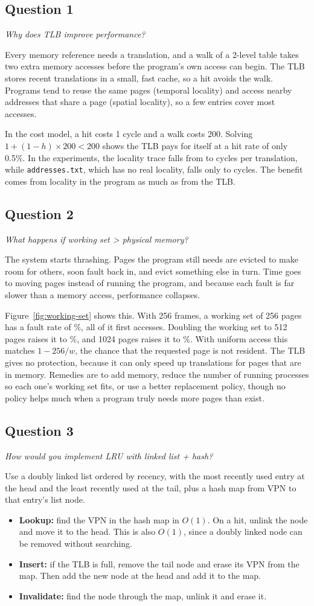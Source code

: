 \documentclass[11pt]{article}
\newcommand{\question}[2]{\subsection*{Question #1}\noindent\textit{#2}\par\medskip}
\newcommand{\code}[1]{\texttt{#1}}
\begin{document}
\question{1}{Why does TLB improve performance?}

Every memory reference needs a translation, and a walk of a 2-level table takes
two extra memory accesses before the program's own access can begin. The TLB
stores recent translations in a small, fast cache, so a hit avoids the walk.
Programs tend to reuse the same pages (temporal locality) and access nearby
addresses that share a page (spatial locality), so a few entries cover most
accesses.

In the cost model, a hit costs 1 cycle and a walk costs 200. Solving
$1 + (1 - h) \times 200 < 200$ shows the TLB pays for itself at a hit rate of only
0.5\%. In the experiments, the locality trace falls from \LocalBaseCycles{} to
\LocalCycles{} cycles per translation, while \code{addresses.txt}, which has no
real locality, falls only to \AvgCycles{} cycles. The benefit comes from locality
in the program as much as from the TLB.

\question{2}{What happens if working set > physical memory?}

The system starts thrashing. Pages the program still needs are evicted to make
room for others, soon fault back in, and evict something else in turn. Time goes to
moving pages instead of running the program, and because each fault is far slower
than a memory access, performance collapses.

Figure~\ref{fig:working-set} shows this. With 256 frames, a working set of 256
pages has a fault rate of \FaultRateFits\%, all of it first accesses. Doubling the
working set to 512 pages raises it to \FaultRateDouble\%, and 1024 pages raises it
to \FaultRateQuad\%. With uniform access this matches $1 - 256/w$, the chance
that the requested page is not resident. The TLB gives no protection, because
it can only speed up translations for pages that are in memory. Remedies are to
add memory, reduce the number of running processes so each one's working set
fits, or use a better replacement policy, though no policy helps much when a
program truly needs more pages than exist.

\question{3}{How would you implement LRU with linked list + hash?}

Use a doubly linked list ordered by recency, with the most recently used entry at
the head and the least recently used at the tail, plus a hash map from VPN to that
entry's list node.

\begin{itemize}
  \item \textbf{Lookup:} find the VPN in the hash map in $O(1)$. On a hit, unlink
  the node and move it to the head. This is also $O(1)$, since a doubly linked
  node can be removed without searching.
  \item \textbf{Insert:} if the TLB is full, remove the tail node and erase its
  VPN from the map. Then add the new node at the head and add it to the map.
  \item \textbf{Invalidate:} find the node through the map, unlink it and erase it.
\end{itemize}
\end{document}
